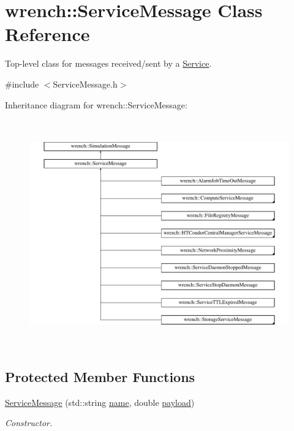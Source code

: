 \hypertarget{classwrench_1_1_service_message}{}\section{wrench\+:\+:Service\+Message Class Reference}
\label{classwrench_1_1_service_message}


Top-\/level class for messages received/sent by a \hyperlink{classwrench_1_1_service}{Service}.  




{\ttfamily \#include $<$Service\+Message.\+h$>$}

Inheritance diagram for wrench\+:\+:Service\+Message\+:\begin{figure}[H]
\begin{center}
\leavevmode
\includegraphics[height=9.840256cm]{classwrench_1_1_service_message}
\end{center}
\end{figure}
\subsection*{Protected Member Functions}
\begin{DoxyCompactItemize}
\item 
\hyperlink{classwrench_1_1_service_message_ae0ee642edc65da18c7d5932dc20f9750}{Service\+Message} (std\+::string \hyperlink{classwrench_1_1_simulation_message_ab224f6dd8ec5ee2e7f65bfcdf2b8a86b}{name}, double \hyperlink{classwrench_1_1_simulation_message_a914f2732713f7c02898e66f05a7cb8a1}{payload})
\begin{DoxyCompactList}\small\item\em Constructor. \end{DoxyCompactList}\end{DoxyCompactItemize}
